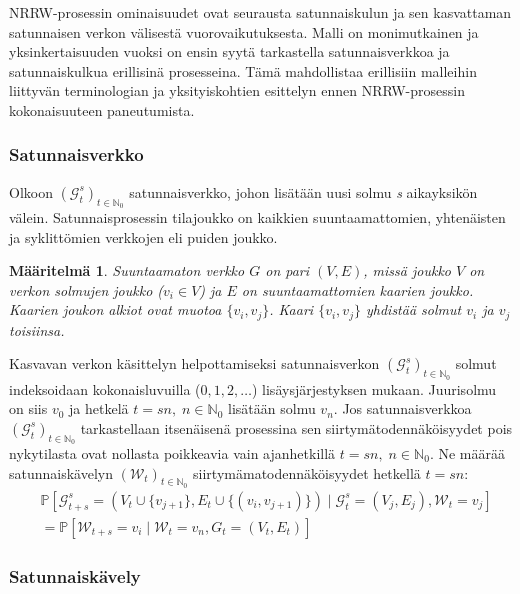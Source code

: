 \documentclass[finnish, 12pt, a4paper, sci, utf8, pdfa]{aaltothesis}
\newcommand{\N}{\mathbb{N}}
\newcommand{\Grandom}{\mathcal{G}}
\newcommand{\Wrandom}{\mathcal{W}}
\newcommand*{\prob}{\mathbb{P}}
\newtheorem{definition}{Määritelmä}
\begin{document}
NRRW-prosessin ominaisuudet ovat seurausta satunnaiskulun ja sen kasvattaman satunnaisen verkon välisestä vuorovaikutuksesta. Malli on monimutkainen ja yksinkertaisuuden vuoksi on ensin syytä tarkastella satunnaisverkkoa ja satunnaiskulkua erillisinä prosesseina. Tämä mahdollistaa erillisiin malleihin liittyvän terminologian ja yksityiskohtien esittelyn ennen NRRW-prosessin kokonaisuuteen paneutumista.

\subsubsection{Satunnaisverkko}

Olkoon \( (\Grandom_{t}^{s})_{t \in \N_{0}} \) satunnaisverkko, johon lisätään uusi solmu \textit{s} aikayksikön välein. Satunnaisprosessin tilajoukko on kaikkien suuntaamattomien, yhtenäisten ja syklittömien verkkojen eli puiden joukko.
\begin{definition}
   \label{definition:verkko}
Suuntaamaton verkko $ G $ on pari $ (V, E) $, missä joukko $ V $ on verkon solmujen joukko (\( v_{i} \in V \)) ja $ E $ on suuntaamattomien kaarien joukko. Kaarien joukon alkiot ovat muotoa \( \{ v_{i}, v_{j} \} \). Kaari \( \{ v_{i}, v_{j} \} \) yhdistää solmut \( v_{i} \) ja \( v_{j} \) toisiinsa. 
\end{definition}
Kasvavan verkon käsittelyn helpottamiseksi satunnaisverkon \( (\Grandom_{t}^{s})_{t \in \N_{0}} \) solmut indeksoidaan kokonaisluvuilla (\( 0, 1, 2, \ldots \)) lisäysjärjestyksen mukaan. Juurisolmu on siis \( v_{0} \) ja hetkelä \( t = sn, \; n \in \N_{0} \) lisätään solmu \( v_{n} \). Jos satunnaisverkkoa \( (\Grandom_{t}^{s})_{t \in \N_{0}} \) tarkastellaan itsenäisenä prosessina sen siirtymätodennäköisyydet pois nykytilasta ovat nollasta poikkeavia vain ajanhetkillä \( t = sn, \; n \in \N_{0} \). Ne määrää satunnaiskävelyn \( (\Wrandom_{t})_{t \in \N_{0}} \) siirtymämatodennäköisyydet hetkellä \( t = sn \):
\begin{equation}
\begin{split}
   & \prob \left[ \Grandom_{t+s}^{s} = (V_{t} \cup \{ v_{j + 1} \}, E_{t} \cup \{ (v_{i}, v_{j + 1}) \}) \mid \Grandom_{t}^{s} = (V_{j}, E_{j}), \Wrandom_{t} = v_{j} \right] \\
   &= \prob \left[ \Wrandom_{t+s} = v_{i} \mid \Wrandom_{t} = v_{n}, G_{t} = (V_{t}, E_{t}) \right]
\end{split}
\end{equation}

\subsubsection{Satunnaiskävely}
\end{document}
